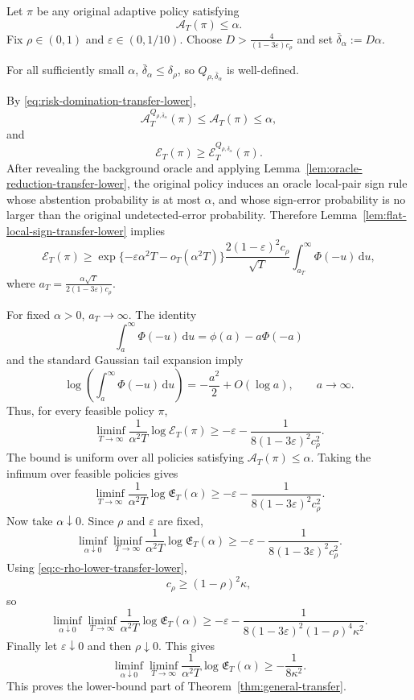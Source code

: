 \documentclass[10pt]{article}
\newcommand{\dd}{\mathrm{d}}
\theoremstyle{plain}
\begin{document}
Let \(\pi\) be any original adaptive policy satisfying
\[
    \mathcal A_T(\pi)\le\alpha.
\]
Fix \(\rho\in(0,1)\) and \(\varepsilon\in(0,1/10)\).  Choose $D>\frac{4}{(1-3\varepsilon)c_\rho}$
and set $\bar\delta_\alpha:=D\alpha$.

For all sufficiently small \(\alpha\), $\bar\delta_\alpha\le\delta_\rho$,
so \(Q_{\rho,\bar\delta_\alpha}\) is well-defined.

By \eqref{eq:risk-domination-transfer-lower},
\[
    \mathcal A_T^{Q_{\rho,\bar\delta_\alpha}}(\pi)
    \le
    \mathcal A_T(\pi)
    \le
    \alpha,
\]
and
\[
    \mathcal E_T(\pi)
    \ge
    \mathcal E_T^{Q_{\rho,\bar\delta_\alpha}}(\pi).
\]
After revealing the background oracle and applying
Lemma~\ref{lem:oracle-reduction-transfer-lower}, the original policy induces an
oracle local-pair sign rule whose abstention probability is at most \(\alpha\), and
whose sign-error probability is no larger than the original undetected-error probability.
Therefore Lemma~\ref{lem:flat-local-sign-transfer-lower} implies
\[
    \mathcal E_T(\pi)
    \ge
    \exp\{-\varepsilon\alpha^2T-o_T(\alpha^2T)\}
    \frac{2(1-\varepsilon)^2c_\rho}{\sqrt T}
    \int_{a_T}^{\infty}\Phi(-u)\,\dd u,
\]
where $a_T
    =
    \frac{\alpha\sqrt T}{2(1-3\varepsilon)c_\rho}$.


For fixed \(\alpha>0\), \(a_T\to\infty\).  The identity
\[
    \int_a^\infty \Phi(-u)\,\dd u
    =
    \phi(a)-a\Phi(-a)
\]
and the standard Gaussian tail expansion imply
\[
    \log
    \left(
        \int_a^\infty \Phi(-u)\,\dd u
    \right)
    =
    -\frac{a^2}{2}+O(\log a),
    \qquad a\to\infty.
\]
Thus, for every feasible policy \(\pi\),
\[
    \liminf_{T\to\infty}
    \frac{1}{\alpha^2T}
    \log \mathcal E_T(\pi)
    \ge
    -\varepsilon
    -
    \frac{1}{8(1-3\varepsilon)^2c_\rho^2}.
\]
The bound is uniform over all policies satisfying
\(\mathcal A_T(\pi)\le\alpha\).  Taking the infimum over feasible policies gives
\[
    \liminf_{T\to\infty}
    \frac{1}{\alpha^2T}
    \log \mathfrak E_T(\alpha)
    \ge
    -\varepsilon
    -
    \frac{1}{8(1-3\varepsilon)^2c_\rho^2}.
\]
Now take \(\alpha\downarrow0\).  Since \(\rho\) and \(\varepsilon\) are fixed,
\[
    \liminf_{\alpha\downarrow0}
    \liminf_{T\to\infty}
    \frac{1}{\alpha^2T}
    \log \mathfrak E_T(\alpha)
    \ge
    -\varepsilon
    -
    \frac{1}{8(1-3\varepsilon)^2c_\rho^2}.
\]
Using \eqref{eq:c-rho-lower-transfer-lower},
\[
    c_\rho\ge(1-\rho)^2\kappa,
\]
so
\[
    \liminf_{\alpha\downarrow0}
    \liminf_{T\to\infty}
    \frac{1}{\alpha^2T}
    \log \mathfrak E_T(\alpha)
    \ge
    -\varepsilon
    -
    \frac{
        1
    }{
        8(1-3\varepsilon)^2(1-\rho)^4\kappa^2
    }.
\]
Finally let \(\varepsilon\downarrow0\) and then \(\rho\downarrow0\).  This gives
\[
    \liminf_{\alpha\downarrow0}
    \liminf_{T\to\infty}
    \frac{1}{\alpha^2T}
    \log \mathfrak E_T(\alpha)
    \ge
    -\frac{1}{8\kappa^2}.
\]
This proves the lower-bound part of Theorem~\ref{thm:general-transfer}.
\end{document}
